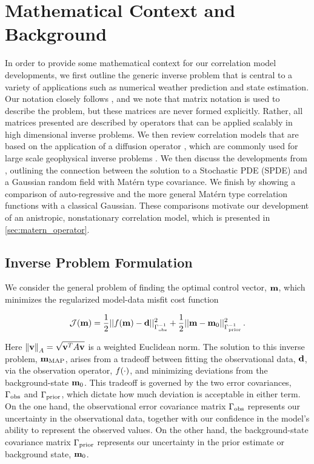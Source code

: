 \section{Mathematical Context and Background}
\label{sec:review}

In order to provide some mathematical context for our correlation model
developments, we first outline the generic inverse problem that is central to
a variety of applications such as numerical weather prediction and state
estimation.
Our notation closely follows \citet{ide_unified_1997}, and we note that matrix
notation is used to describe the problem, but these matrices are never formed
explicitly.
Rather, all matrices presented are described by operators that can be applied
scalably in high dimensional inverse problems.
We then review correlation models that are based on the application of a
diffusion operator \citep{weaver_correlation_2001,mirouze_representation_2010},
which are commonly used for large scale geophysical inverse problems
\citep[e.g.][]{forgetECCOv4,moore_regional_2011-1}.
We then discuss the developments from \citet{RSSB:RSSB777}, outlining the
connection between the solution to a Stochastic PDE (SPDE) and a Gaussian random
field with Mat\'ern type covariance.
We finish by showing a comparison of auto-regressive and the more general
Mat\'ern type correlation functions with a classical Gaussian.
These comparisons motivate our development of an anistropic, nonstationary correlation
model, which is presented in \cref{sec:matern_operator}.


\subsection{Inverse Problem Formulation}
\label{ssec:da_formulation}

We consider the general problem of finding the optimal control vector,
$\mathbf{m}$, which minimizes the regularized model-data misfit cost function
\begin{linenomath*}\begin{equation*}
    \mathcal{J}(\mathbf{m}) =
        \dfrac{1}{2}||f(\mathbf{m}) - \mathbf{d}||_{\Gamma_\text{obs}^{-1}}^2
        +
        \dfrac{1}{2}||\mathbf{m} - \mathbf{m}_{0}||_{\Gamma_{\text{prior}}^{-1}}^2 \, .
\end{equation*}\end{linenomath*}
Here $\left\lVert\mathbf{v}\right\rVert_A = \sqrt{\mathbf{v}^T A \mathbf{v}}$ is a weighted
Euclidean norm.
The solution to this inverse problem, $\mathbf{m}_{\text{MAP}}$, arises from a tradeoff between fitting the
observational data, $\mathbf{d}$, via the observation operator, $f(\cdot)$,
and minimizing deviations from the background-state $\mathbf{m}_{0}$.
This tradeoff is governed by the two error covariances, $\Gamma_\text{obs}$ and
$\Gamma_{\text{prior}}$, which dictate how much deviation is acceptable in either term.
On the one hand, the observational error covariance matrix
$\Gamma_\text{obs}$ represents our uncertainty
in the observational data, together with our confidence in the model's ability
to represent the observed values.
On the other hand, the background-state covariance matrix $\Gamma_{\text{prior}}$
represents our uncertainty in the prior estimate or background state,
$\mathbf{m}_{0}$.

